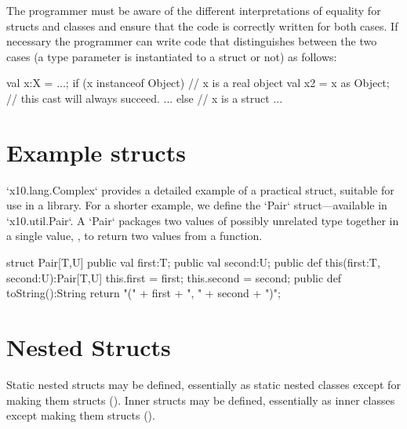 The programmer must be aware of the different interpretations of
equality for structs and classes and ensure that the code is correctly
written for both cases. If necessary the programmer can write code
that distinguishes between the two cases (a type parameter  is
instantiated to a struct or not) as follows:

\begin{xten}
val x:X = ...;
if (x instanceof Object) { // x is a real object
   val x2 = x as Object; // this cast will always succeed.
   ...
} else { // x is a struct
   ...
}
\end{xten}
 
  
\section{Example structs}

\xcd`x10.lang.Complex` provides a detailed example of a practical struct,
suitable for use in a library.  For a shorter example, we define the
\xcd`Pair` struct---available in \xcd`x10.util.Pair`.  A \xcd`Pair` packages
two values of possibly unrelated type together in a single value, \eg, to
return two values from a function.

\begin{xten}
struct Pair[T,U] {
    public val first:T;
    public val second:U;
    public def this(first:T, second:U):Pair[T,U] {
        this.first = first;
        this.second = second;
    }
    public def toString():String {
        return "(" + first + ", " + second + ")";
    }
}
\end{xten}
%

\section{Nested Structs}

Static nested structs may be defined, essentially as static nested classes
except for making them structs
().  Inner structs may be defined, essentially as
inner classes except making them structs ().
